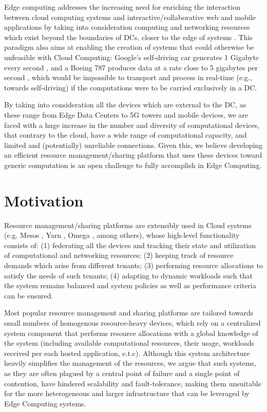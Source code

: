 Edge computing addresses the increasing need for enriching the interaction between cloud computing systems and interactive/collaborative web and mobile applications \cite{10.1145/242857.242867} by taking into consideration computing and networking resources which exist beyond the boundaries of DCs, closer to the edge of systems \cite{Leitao2018} \cite{7488250}. This paradigm also aims at enabling the creation of systems that could otherwise be unfeasible with Cloud Computing: Google's self-driving car generates 1 Gigabyte every second \cite{datafloq}, and a Boeing 787 produces data at a rate close to 5 gigabytes per second \cite{finnegan_2013}, which would be impossible to transport and process in real-time (e.g., towards self-driving) if the computations were to be carried exclusively in a DC.

By taking into consideration all the devices which are external to the DC, as these range from Edge Data Centers to 5G towers and mobile devices, we are faced with a huge increase in the number and diversity of computational devices, that contrary to the cloud, have a wide range of computational capacity, and limited and (potentially) unreliable connections. Given this, we believe developing an efficient resource management/sharing platform that uses these devices toward generic computation is an open challenge to fully accomplish in Edge Computing.

\section{Motivation}

Resource management/sharing platforms are extensibly used in Cloud systems (e.g. Mesos \cite{hindman2011mesos}, Yarn \cite{Vavilapalli2013ApacheHY}, Omega \cite{41684}, among others), whose high-level functionality consists of: (1) federating all the devices and tracking their state and utilization of computational and networking resources; (2) keeping track of resource demands which arise from different tenants; (3) performing resource allocations to satisfy the needs of such tenants; (4) adapting to dynamic workloads such that the system remains balanced and system policies as well as performance criteria can be ensured.

Most popular resource management and sharing platforms are tailored towards small numbers of homogenous resource-heavy devices, which rely on a centralized system component that performs resource allocations with a global knowledge of the system (including available computational resources, their usage, workloads received per each hosted application, e.t.c). Although this system architecture heavily simplifies the management of the resources, we argue that such systems, as they are often plagued by a central point of failure and a single point of contention, have hindered scalability and fault-tolerance, making them unsuitable for the more heterogeneous and larger infrastructure that can be leveraged by Edge Computing systems. 

